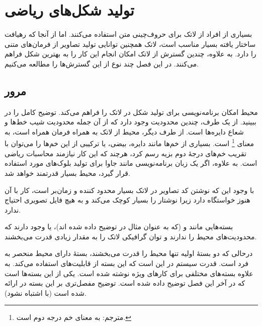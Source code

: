 \chapter{تولید شکل‌های ریاضی}
\label{chap:graphics}

\begin{intro}
بسیاری از افراد از لاتک برای حروف‌چینی متن استفاده می‌کنند. اما از آنجا که رهیافت ساختار یافته بسیار مناسب است، لاتک همچنین توانایی تولید تصاویر از فرمان‌های متنی را دارد. به علاوه، چندین گسترش از لاتک امکان انجام این کار را به بهترین شکل فراهم می‌کنند. در این فصل چند نوع از این گسترش‌ها را مطالعه می‌کنیم.

\end{intro}


\section{مرور}
محیط  امکان برنامه‌نویسی برای تولید شکل در لاتک را فراهم می‌کند. توضیح کامل را در  \manual ببینید. از یک طرف، چندین محدودیت وجود دارد که از آن جمله محدودیت شیب خط‌ها و شعاع دایره‌ها است. از طرف دیگر، محیط  از لاتک به همراه فرمان  همراه است،  به معنای 
\footnote{مترجم: به معنای خم درجه دوم است.}
 است.  بسیاری از خم‌ها مانند دایره‌، بیضی،  یا ترکیبی از این خم‌ها را می‌توان با تقریب خم‌های درجهٔ دوم بزیه رسم کرد، هرچند که این کار نیازمند محاسبات ریاضی است. به علاوه، اگر یک زبان برنامه‌نویسی مانند جاوا برای تولید بلوک‌های  مورد استفاده قرار گیرد، محیط   بسیار قدرتمند خواهد شد.

با  وجود این که نوشتن کد تصاویر در لاتک بسیار محدود کننده و زمان‌بر است، کار با آن هنوز خواستگاه دارد زیرا نوشتار‌‌ را بسیار کوچک می‌کند و به هیچ فایل تصویری احتیاج ندارد.

بسته‌هایی مانند   و  (که به عنوان مثال در 
\companion توضیح داده شده اند)، 
یا  وجود دارند که محدودیت‌های محیط  را ندارند و توان گرافیکی لاتک را به مقدار زیادی قدرت می‌بخشند.

درحالی که دو بستهٔ اولیه تنها محیط  را قدرت می‌بخشند، بستهٔ 
دارای محیط منحصر به فرد  است. قدرت سیستم  در این است که این بسته از قابلیت‌های \PSi استفاده می‌کند. به علاوه بسته‌های مختلفی برای کارهای ویژه نوشته شده است. یکی از این بسته‌ها  است که در آخر این فصل توضیح داده شده است. توضیح مفصل‌تری بر این بسته در  
\graphicscompanion   ارائه شده است 
(با 
\companion اشتباه نشود).

